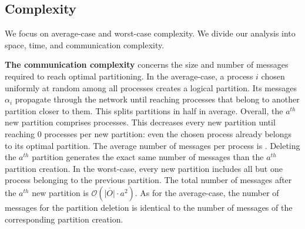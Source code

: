 \subsection{Complexity}
\label{subsec:complexity}


We focus on average-case and worst-case complexity. We divide our
analysis into space, time, and communication complexity.

\textbf{The communication complexity} concerns the size and number of
messages required to reach optimal partitioning. In the average-case,
a process $i$ chosen uniformly at random among all processes creates a
logical partition. Its messages $\alpha_i$ propagate through the
network until reaching processes that belong to another partition
closer to them. This splits partitions in half in average. Overall,
the $a^{th}$ new partition comprises
processes. This decreases every new partition until reaching $0$
processes per new partition: even the chosen process already belongs
to its optimal partition. The average number of messages per process
is .  Deleting the
$a^{th}$ partition generates the exact same number of messages than
the $a^{th}$ partition creation.  In the
worst-case, every new partition includes all but one process belonging
to the previous partition. The total number of messages after the
$a^{th}$ new partition is $\mathcal{O}(\overline{|O|}\cdot a^2)$. As
for the average-case, the number of messages for the partition
deletion is identical to the number of messages of the corresponding
partition creation.

